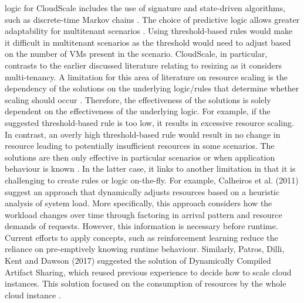 logic for CloudScale includes the use of signature and state-driven
algorithms, such as discrete-time Markov chains \cite{shen2011cloudscale}. The choice of predictive logic allows greater
adaptability for multitenant scenarios \cite{antonescu2015service,das2016automated}. Using threshold-based rules would
make it difficult in multitenant scenarios as the threshold would need
to adjust based on the number of VMs present in the scenario.
CloudScale, in particular, contrasts to the earlier discussed literature
relating to resizing as it considers multi-tenancy.
\newline\newline
A limitation for this area of literature on resource scaling is the
dependency of the solutions on the underlying logic/rules that determine
whether scaling should occur \cite{alhamazani2013overview}. Therefore, the
effectiveness of the solutions is solely dependent on the effectiveness
of the underlying logic. For example, if the suggested threshold-based
rule is too low, it results in excessive resource scaling. In
contrast, an overly high threshold-based rule would result in no change
in resource leading to potentially insufficient resources in some scenarios.
The solutions are then only effective in particular scenarios or when
application behaviour is known \cite{calheiros2011virtual}. In the latter case, it links to another limitation in that it is challenging to
create rules or logic on-the-fly.
\newline\newline
For example, Calheiros et al. (2011) suggest an approach that
dynamically adjusts resources based on a heuristic analysis of system
load. More specifically, this approach considers how the workload
changes over time through factoring in arrival pattern and
resource demands of requests. However, this information is necessary
before runtime. Current efforts to apply concepts, such as reinforcement
learning \cite{lorido2014review} reduce the reliance on
pre-emptively knowing runtime behaviour. Similarly, Patros, Dilli, Kent
and Dawson (2017) suggested the solution of Dynamically Compiled
Artifact Sharing, which reused previous experience to decide how to scale cloud instances. This solution focused on the consumption of resources by the whole cloud instance \cite{patros2017dynamically}.
